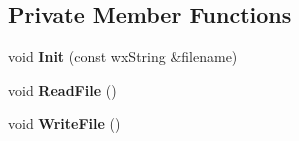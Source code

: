 \subsection*{Private Member Functions}
\begin{DoxyCompactItemize}
\item 
void {\bfseries Init} (const wxString \&filename)\label{classKademlia_1_1CPrefs_ae0f71c5f31cc7a86558bd8181f22cbfc}

\item 
void {\bfseries ReadFile} ()\label{classKademlia_1_1CPrefs_a2a2af006131eb9a2d368b35b6935c7b3}

\item 
void {\bfseries WriteFile} ()\label{classKademlia_1_1CPrefs_a80caa69902be3c72af7f6bef1591c04a}

\end{DoxyCompactItemize}
